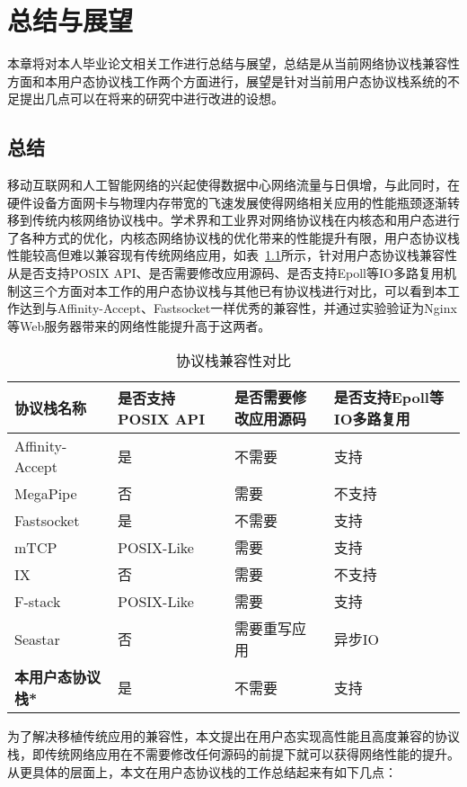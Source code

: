 \chapter{总结与展望}
本章将对本人毕业论文相关工作进行总结与展望，总结是从当前网络协议栈兼容性方面和本用户态协议栈工作两个方面进行，展望是针对当前用户态协议栈系统的不足提出几点可以在将来的研究中进行改进的设想。
\section{总结}
移动互联网和人工智能网络的兴起使得数据中心网络流量与日俱增，与此同时，在硬件设备方面网卡与物理内存带宽的飞速发展使得网络相关应用的性能瓶颈逐渐转移到传统内核网络协议栈中。学术界和工业界对网络协议栈在内核态和用户态进行了各种方式的优化，内核态网络协议栈的优化带来的性能提升有限，用户态协议栈性能较高但难以兼容现有传统网络应用，如表~\ref{tab:compare}所示，针对用户态协议栈兼容性从是否支持POSIX API、是否需要修改应用源码、是否支持Epoll等IO多路复用机制这三个方面对本工作的用户态协议栈与其他已有协议栈进行对比，可以看到本工作达到与Affinity-Accept、Fastsocket一样优秀的兼容性，并通过实验验证为Nginx等Web服务器带来的网络性能提升高于这两者。

\begin{table}[]
\centering
\caption{协议栈兼容性对比}
\label{tab:compare}
\begin{tabular}{lllp{3cm}}
\toprule[1.5pt]
\textbf{协议栈名称} & \textbf{是否支持POSIX API} & \textbf{是否需要修改应用源码} & \textbf{是否支持Epoll等IO多路复用} \\ 
\midrule[1pt]
Affinity-Accept & 是 & 不需要 & 支持 \\
MegaPipe &  否  & 需要  & 不支持 \\
Fastsocket & 是 & 不需要 & 支持 \\
mTCP & POSIX-Like & 需要 & 支持 \\
IX & 否 & 需要 & 不支持 \\
F-stack & POSIX-Like & 需要 & 支持 \\
Seastar & 否 & 需要重写应用 & 异步IO \\
\textbf{本用户态协议栈*} & 是 & 不需要 & 支持 \\
\bottomrule[1.5pt]
\end{tabular}
\end{table}

为了解决移植传统应用的兼容性，本文提出在用户态实现高性能且高度兼容的协议栈，即传统网络应用在不需要修改任何源码的前提下就可以获得网络性能的提升。从更具体的层面上，本文在用户态协议栈的工作总结起来有如下几点：

